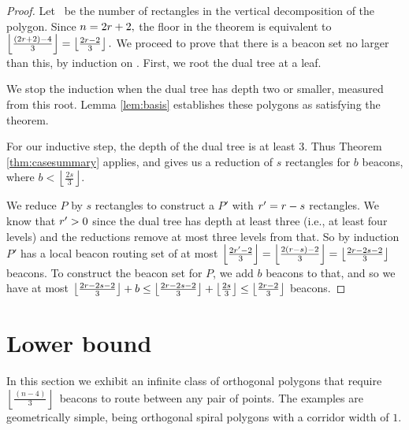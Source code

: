 \documentclass{article}
\newcommand{\floor}[2]{\ensuremath{\left \lfloor {\frac{#1}{#2}} \right
\rfloor}}
\begin{document}
		\begin{proof}
			Let \nrect\  be the number of rectangles in the vertical decomposition of the
			polygon.  Since $n = 2r + 2,$ the floor in the theorem is equivalent to
			$\floor{(2\nrect + 2)-4}{3} = \floor{2\nrect - 2}{3}.$  We proceed to prove
			that there is a beacon set no larger than this, by induction on \nrect.
			First, we root the dual tree at a leaf.
			
			We stop the induction when the dual tree has depth two or smaller, measured
			from this root.
			Lemma \ref{lem:basis} establishes these polygons as satisfying the theorem.

			For our inductive step, the depth of the dual tree is at least 3.
			Thus Theorem \ref{thm:casesummary} applies, and gives us a reduction of
			$s$ rectangles for $b$ beacons, where $b < \floor{2s}{3}$.
			
			We reduce $P$ by $s$ rectangles to construct a
			$P'$ with $r' = r-s$ rectangles.
			We know that $r' > 0$ since the dual tree has depth at least three
			(i.e., at least four levels)
			and the reductions remove at most three levels from that.
			So by induction $P'$ has a local beacon routing set of at most 
			$\floor{2\nrect'- 2}{3}= \floor{2(\nrect-s)-2}{3} = 
			\floor{2\nrect- 2s - 2}{3}$ beacons.
			To construct the beacon set for $P$, we add $b$ beacons to that, 
			and so we have at most
			$\floor{2\nrect- 2s - 2}{3} + b \leq 
			 \floor{2\nrect- 2s - 2}{3} + \floor{2s}{3} \leq
			 \floor{2\nrect - 2}{3}$ beacons.
		\end{proof}	 
		 
		 
\section{Lower bound} 

\newcommand{\mXin}[1]{\ensuremath{m_{#1}^{\mbox{\small in}}}}
\newcommand{\mXout}[1]{\ensuremath{m_{#1}^{\mbox{\small out}}}} 
\newcommand{\mkin}{\mXin{k}}		
\newcommand{\mkout}{\mXout{k}}
\newcommand{\mimin}{\mXin{3i-2}}
\newcommand{\mimout}{\mXout{3i-2}}
\newcommand{\mipin}{\mXin{3i+1}}
\newcommand{\mipout}{\mXout{3i+1}}
\newcommand{\Hp}[1]{\ensuremath{H^{+}_{#1}}}
\newcommand{\Hm}[1]{\ensuremath{H^{-}_{#1}}}

	In this section we exhibit an infinite class of orthogonal polygons
	that require
	\floor{(n-4)}{3}\ beacons to route between any pair of points.
	The examples are geometrically simple, being orthogonal spiral
	polygons with a corridor width of $1$.
\end{document}
